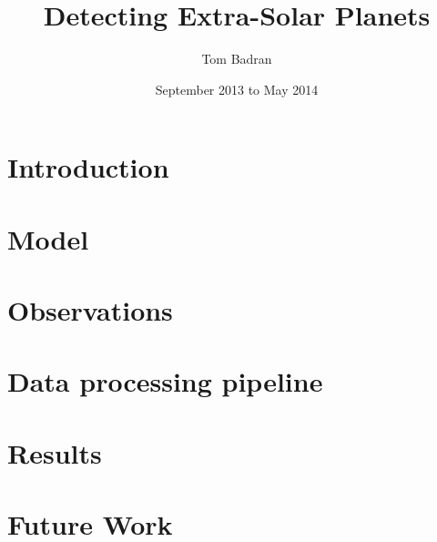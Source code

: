 \documentclass[a4paper]{article}
\title{Detecting Extra-Solar Planets}
\author{Tom Badran}
\date{September 2013 to May 2014}
\numberwithin{equation}{section}
\begin{document}
\maketitle

\begin{abstract}

\end{abstract}

\tableofcontents
\listoffigures
\listoftables

\section{Introduction}


\section{Model}


\section{Observations}


\section{Data processing pipeline}


\section{Results}


\section{Future Work}




\break
\appendix
{}


\end{document}
